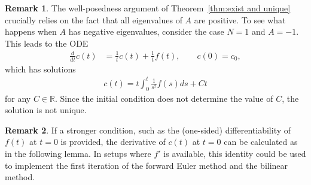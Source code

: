 \documentclass{article}
\theoremstyle{definition}
\newtheorem{remark}{Remark}[section]
\begin{document}

\begin{remark}
    The well-posedness argument of Theorem~\ref{thm:exist and unique} crucially relies on the fact that all eigenvalues of $A$ are positive.
    To see what happens when $A$ has negative eigenvalues, consider the case $N=1$ and $A=-1$. 
    This leads to the ODE
    \begin{align*}
        \frac{d}{dt}c(t) &= \frac{1}{t} c(t) + \frac{1}{t} f(t),\qquad c(0)=c_0,
    \end{align*}
    which has solutions
    \begin{align*}
        c(t) = t \int_0^t \frac{1}{s^2}f(s)ds + Ct
    \end{align*}
    for any $C\in \mathbb{R}$. Since the initial condition does not determine the value of $C$, the solution is not unique.
\end{remark}


\begin{remark}
    If a stronger condition, such as the (one-sided) differentiability of $f(t)$ at $t=0$ is provided, the derivative of $c(t)$ at $t=0$ can be calculated as in the following lemma. In setups where $f'$ is available, this identity could be used to implement the first iteration of the forward Euler method and the bilinear method.
\end{remark}
\end{document}
